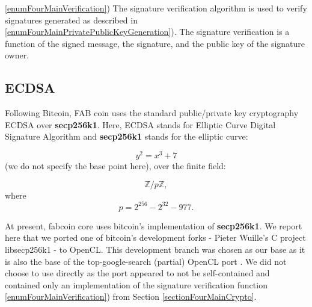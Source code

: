\documentclass{article}
\newcommand{\secpTwoFiveSixKone}{{\bf secp256k1}}
\begin{document}
\noindent\ref{enumFourMainVerification}) The signature verification algorithm is used to verify signatures generated as described in \ref{enumFourMainPrivatePublicKeyGeneration}). The signature verification is a function of the signed message, the signature, and the public key of the signature owner.

\subsection{ECDSA}\label{sectionECDSAgeneral}
Following Bitcoin, FAB coin uses the standard public/private key cryptography ECDSA over \secpTwoFiveSixKone. Here, ECDSA stands for Elliptic Curve Digital Signature Algorithm and \secpTwoFiveSixKone{} stands for the elliptic curve:

\[
y^2 = x^3 + 7
\]
(we do not specify the base point here), over the finite field:

\[
\mathbb Z / p\mathbb Z, 
\]
where
\begin{equation}\label{eqThePrime}
p= 2^{256} - 2^{32} - 977.
\end{equation}

At present, fabcoin core uses bitcoin's implementation of \secpTwoFiveSixKone{}. We report here that we ported one of bitcoin's development forks - Pieter Wuille's C project libsecp256k1 \cite{Wuille:secp256k1}  - to OpenCL. This development branch was chosen as our base as it is also the base of the top-google-search (partial) OpenCL port \cite{secp256k1:openCLimplementationHanh0}. We did not choose to use \cite{secp256k1:openCLimplementationHanh0} directly as the port appeared to not be self-contained and contained only an implementation of the signature verification function \ref{enumFourMainVerification})  from Section \ref{sectionFourMainCrypto}.




\end{document}
